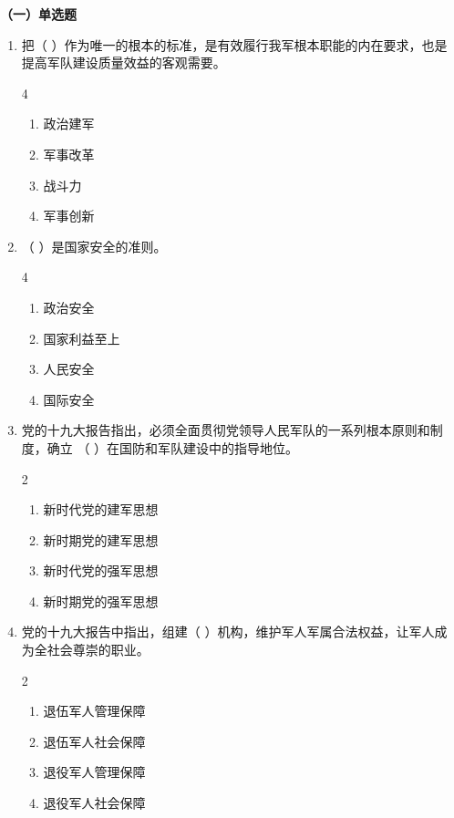 \documentclass[a4paper,11pt]{ctexart}
\begin{document}
\textbf{（一）单选题}
\begin{enumerate}
    \item 把（ ）作为唯一的根本的标准，是有效履行我军根本职能的内在要求，也是提高军队建设质量效益的客观需要。
    \begin{multicols}{4}
    \begin{enumerate}
        \item 政治建军
        \item 军事改革
        \item 战斗力
        \item 军事创新
    \end{enumerate}
    \end{multicols}
    
    \item （ ）是国家安全的准则。
    \begin{multicols}{4}
    \begin{enumerate}
        \item 政治安全
        \item 国家利益至上
        \item 人民安全
        \item 国际安全
    \end{enumerate}
    \end{multicols}

    \item 党的十九大报告指出，必须全面贯彻党领导人民军队的一系列根本原则和制度，确立 （ ）在国防和军队建设中的指导地位。
    \begin{multicols}{2}
    \begin{enumerate}
        \item 新时代党的建军思想
        \item 新时期党的建军思想
        \item 新时代党的强军思想
        \item 新时期党的强军思想
    \end{enumerate}
    \end{multicols}

    \item 党的十九大报告中指出，组建（ ）机构，维护军人军属合法权益，让军人成为全社会尊崇的职业。
    \begin{multicols}{2}
    \begin{enumerate}
        \item 退伍军人管理保障
        \item 退伍军人社会保障
        \item 退役军人管理保障
        \item 退役军人社会保障
    \end{enumerate}
    \end{multicols}


\end{enumerate}
\end{document}
